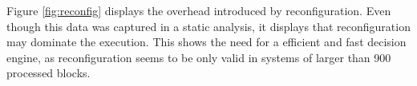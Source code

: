 Figure \ref{fig:reconfig} displays the overhead introduced by reconfiguration. Even though this data was captured in a static analysis, it displays that reconfiguration may dominate the execution. This shows the need for a efficient and fast decision engine, as reconfiguration seems to be only valid in systems of larger than 900 processed blocks. 
%
